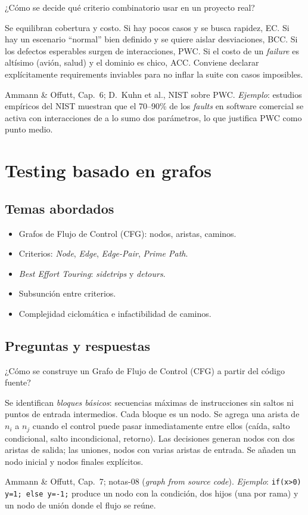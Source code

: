 \documentclass[11pt,a4paper]{article}
\newcounter{preg}
\newcommand{\qa}[3]{%
  \stepcounter{preg}%
  \vspace{0.4em}
  \begin{preguntabox}{\thepreg}
  #1
  \end{preguntabox}
  \begin{respuestabox}
  #2
  \end{respuestabox}
  \begin{refbox}
  #3
  \end{refbox}
  \vspace{0.6em}
}
\begin{document}
\qa{¿Cómo se decide qué criterio combinatorio usar en un proyecto real?}
{Se equilibran cobertura y costo. Si hay pocos casos y se busca rapidez, EC. Si hay un escenario ``normal'' bien definido y se quiere aislar desviaciones, BCC. Si los defectos esperables surgen de interacciones, PWC. Si el costo de un \emph{failure} es altísimo (avión, salud) y el dominio es chico, ACC. Conviene declarar explícitamente requirements inviables para no inflar la suite con casos imposibles.}
{Ammann \& Offutt, Cap.~6; D.~Kuhn et al., NIST sobre PWC. \emph{Ejemplo}: estudios empíricos del NIST muestran que el 70--90\% de los \emph{faults} en software comercial se activa con interacciones de a lo sumo dos parámetros, lo que justifica PWC como punto medio.}

\section{Testing basado en grafos}

\subsection*{Temas abordados}
\begin{itemize}[leftmargin=1.4em]
  \item Grafos de Flujo de Control (CFG): nodos, aristas, caminos.
  \item Criterios: \emph{Node}, \emph{Edge}, \emph{Edge-Pair}, \emph{Prime Path}.
  \item \emph{Best Effort Touring}: \emph{sidetrips} y \emph{detours}.
  \item Subsunción entre criterios.
  \item Complejidad ciclomática e infactibilidad de caminos.
\end{itemize}

\subsection*{Preguntas y respuestas}

\qa{¿Cómo se construye un Grafo de Flujo de Control (CFG) a partir del código fuente?}
{Se identifican \emph{bloques básicos}: secuencias máximas de instrucciones sin saltos ni puntos de entrada intermedios. Cada bloque es un nodo. Se agrega una arista de $n_i$ a $n_j$ cuando el control puede pasar inmediatamente entre ellos (caída, salto condicional, salto incondicional, retorno). Las decisiones generan nodos con dos aristas de salida; las uniones, nodos con varias aristas de entrada. Se añaden un nodo inicial y nodos finales explícitos.}
{Ammann \& Offutt, Cap.~7; notas-08 (\emph{graph from source code}). \emph{Ejemplo}: \texttt{if(x>0) y=1; else y=-1;} produce un nodo con la condición, dos hijos (una por rama) y un nodo de unión donde el flujo se reúne.}
\end{document}

